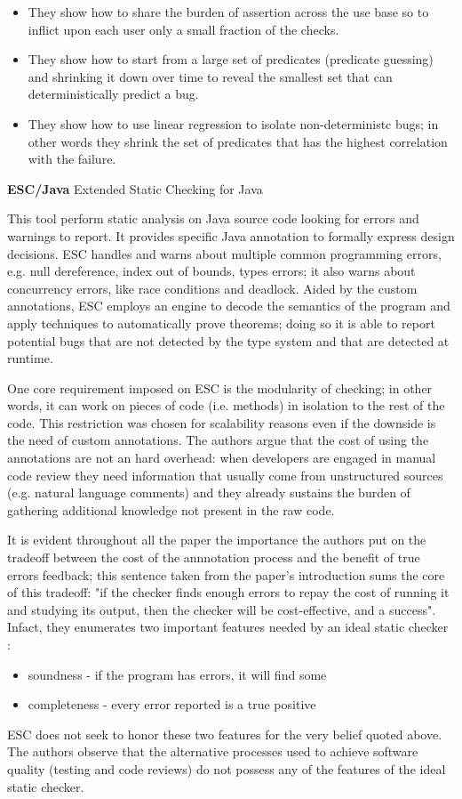 \begin{itemize}
    \item They show how to share the burden of assertion across the use base so to inflict upon each user only a small fraction of the checks.
    \item They show how to start from a large set of predicates (predicate guessing) and shrinking it down over time to reveal the smallest set that can deterministically predict a bug.
    \item They show how to use linear regression to isolate non-deterministc bugs; in other words they shrink the set of predicates that has the highest correlation with the failure.
\end{itemize}
\textbf{ESC/Java} \cite{flanagan2002extended} Extended Static Checking for Java

This tool perform static analysis on Java source code looking for errors and warnings to report. It provides specific Java annotation to formally express design decisions. 
ESC handles and warns about multiple common programming errors, e.g. null dereference, index out of bounds, types errors; it also warns about concurrency errors, like race conditions and deadlock.
Aided by the custom annotations, ESC employs an engine to decode the semantics of the program and apply techniques to automatically prove theorems; doing so it is able to report potential bugs that are not detected by the type system and that are detected at runtime.


One core requirement imposed on ESC is the modularity of checking; in other words, it can work on pieces of code (i.e. methods) in isolation to the rest of the code. This restriction was chosen for scalability reasons even if the downside is the need of custom annotations.
The authors argue that the cost of using the annotations are not an hard overhead: when developers are engaged in manual code review they need information that usually come from unstructured sources (e.g. natural language comments) and they already sustains the burden of gathering additional knowledge not present in the raw code.

It is evident throughout all the paper the importance the authors put on the tradeoff between the cost of the annnotation process and the benefit of true errors feedback; this sentence taken from the paper's introduction sums the core of this tradeoff: "if the checker finds enough errors to repay the cost of running it and studying its output, then the checker will be cost-effective, and a success".
Infact, they enumerates two important features needed by an ideal static checker : 
\begin{itemize}
    \item soundness - if the program has errors, it will find some
    \item completeness - every error reported is a true positive
\end{itemize}
ESC does not seek to honor these two features for the very belief quoted above. The authors observe that the alternative processes used to achieve software quality (testing and code reviews) do not possess any of the features of the ideal static checker.

